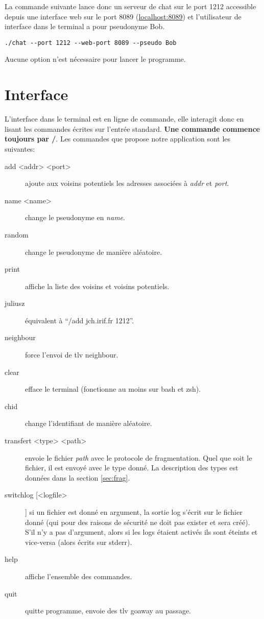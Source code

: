 \documentclass[a4paper,10pt]{article} %
\begin{document}
La commande suivante lance donc un serveur de chat sur le port 1212 accessible depuis une interface web sur le port 8089 (\href{localhost:8089}{localhost:8089}) et l'utilisateur de interface dans le terminal a pour pseudonyme Bob.

\begin{verbatim}
./chat --port 1212 --web-port 8089 --pseudo Bob
\end{verbatim}

Aucune option n'est nécessaire pour lancer le programme.

\section{Interface}

L'interface dans le terminal est en ligne de commande, elle interagit donc en lisant les commandes écrites sur l'entrée standard. \textbf{Une commande commence toujours par /}. Les commandes que propose notre application sont les suivantes:
\begin{description}
\item[add <addr> <port>] ajoute aux voisins potentiels les adresses associées à \textit{addr} et \textit{port}.
\item[name <name>] change le pseudonyme en \textit{name}.
\item[random] change le pseudonyme de manière aléatoire.
\item[print] affiche la liste des voisins et voisins potentiels.
\item[juliusz] équivalent à ``/add jch.irif.fr 1212''.
\item[neighbour] force l'envoi de tlv neighbour.
\item[clear] efface le terminal (fonctionne au moins sur bash et zsh).
\item[chid] change l'identifiant de manière aléatoire.
\item[transfert <type> <path>] envoie le fichier \textit{path} avec le protocole de fragmentation. Quel que soit le fichier, il est envoyé avec le type donné. La description des types est données dans la section \ref{sec:frag}.
\item[switchlog [<logfile>]] si un fichier est donné en argument, la sortie log s'écrit sur le fichier donné (qui pour des raisons de sécurité ne doit pas exister et sera créé). S'il n'y a pas d'argument, alors si les logs étaient activés ils sont éteints et vice-versa (alors écrits sur stderr).
\item[help] affiche l'ensemble des commandes.
\item[quit] quitte programme, envoie des tlv goaway au passage.
\end{description}
\end{document}
